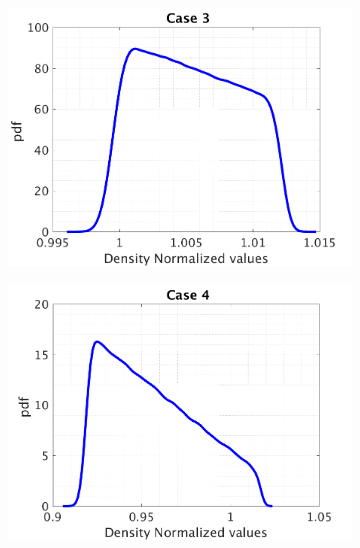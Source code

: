 \documentclass{article}
\begin{document}
\begin{figure}[H]
\begin{center}
\begin{subfigure}{0.4\textwidth}
    \centering\includegraphics[width=1.1\textwidth,keepaspectratio]{images/inverse_problem/infer_drag/case3/density_PDF.png}
    \caption{\centering  }
  \end{subfigure}
 \begin{subfigure}{0.4\textwidth}
    \centering\includegraphics[width=1.1\textwidth,keepaspectratio]{images/inverse_problem/infer_drag/case4/density_PDF.png}
    \caption{\centering }
  \end{subfigure}
  \begin{subfigure}{0.4\textwidth}

\end{subfigure}
\end{center}
\end{figure}
\end{document}
